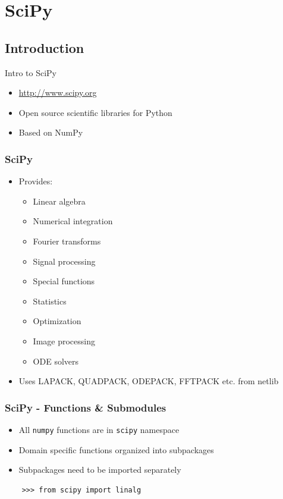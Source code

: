 \documentclass[14pt,compress]{beamer}
\newcommand{\typ}[1]{\lstinline{#1}}
\begin{document}
\section{SciPy}
\subsection{Introduction}
\begin{frame}
    {Intro to SciPy}
  \begin{itemize}
  \item \url{http://www.scipy.org}
  \item Open source scientific libraries for Python
  \item Based on NumPy
    \end{itemize}
\end{frame}

\begin{frame}
  \frametitle{SciPy}
  \begin{itemize}
  \item Provides:
    \begin{itemize}
    \item Linear algebra
    \item Numerical integration
    \item Fourier transforms
    \item Signal processing
    \item Special functions
    \item Statistics
    \item Optimization
    \item Image processing
    \item ODE solvers
    \end{itemize}
  \item Uses LAPACK, QUADPACK, ODEPACK, FFTPACK etc. from netlib
  \end{itemize}
\end{frame}

\begin{frame}[fragile]
  \frametitle{SciPy - Functions \& Submodules}
  \begin{itemize}
    \item All \typ{numpy} functions are in \typ{scipy} namespace
    \item Domain specific functions organized into subpackages
    \item Subpackages need to be imported separately
  \end{itemize}
  \begin{lstlisting}
    >>> from scipy import linalg
  \end{lstlisting}
\end{frame}
\end{document}
